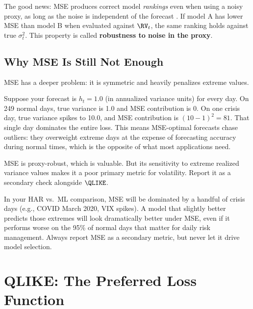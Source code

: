 The good news: MSE produces correct model \emph{rankings} even when using a noisy proxy, as long as the noise is independent of the forecast \citep{Patton2011}.
If model A has lower MSE than model B when evaluated against $\RV_t$, the same ranking holds against true $\sigma^2_t$.
This property is called \textbf{robustness to noise in the proxy}.

\subsection{Why MSE Is Still Not Enough}

MSE has a deeper problem: it is symmetric and heavily penalizes extreme values.

\begin{intuition}
Suppose your forecast is $h_t = 1.0$ (in annualized variance units) for every day.
On 249 normal days, true variance is 1.0 and MSE contribution is 0.
On one crisis day, true variance spikes to 10.0, and MSE contribution is $(10 - 1)^2 = 81$.
That single day dominates the entire loss.
This means MSE-optimal forecasts chase outliers: they overweight extreme days at the expense of forecasting accuracy during normal times, which is the opposite of what most applications need.
\end{intuition}

\begin{keyidea}
MSE is proxy-robust, which is valuable.
But its sensitivity to extreme realized variance values makes it a poor primary metric for volatility.
Report it as a secondary check alongside $\QLIKE$.
\end{keyidea}

\begin{projectconnection}
In your HAR vs.\ ML comparison, MSE will be dominated by a handful of crisis days (e.g., COVID March 2020, VIX spikes).
A model that slightly better predicts those extremes will look dramatically better under MSE, even if it performs worse on the 95\% of normal days that matter for daily risk management.
Always report MSE as a secondary metric, but never let it drive model selection.
\end{projectconnection}


\section{QLIKE: The Preferred Loss Function}
\label{sec:eval-qlike}

